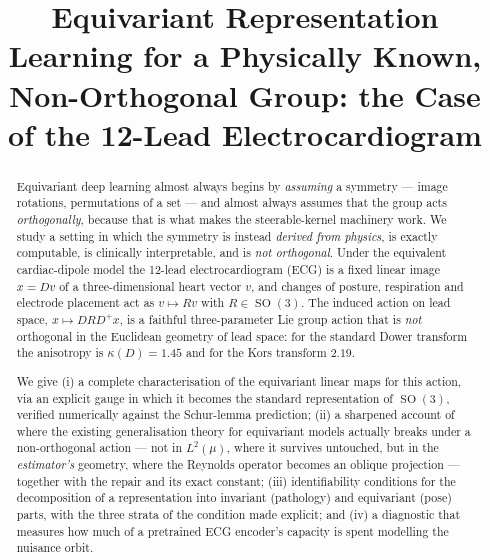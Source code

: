 \documentclass[11pt]{article}
\title{\bfseries Equivariant Representation Learning for a Physically Known,\\
Non-Orthogonal Group: the Case of the 12-Lead Electrocardiogram}
\author{}
\date{}
\theoremstyle{definition}
\DeclareMathOperator{\SO}{SO}
\begin{document}
\maketitle

\begin{abstract}
Equivariant deep learning almost always begins by \emph{assuming} a symmetry --- image
rotations, permutations of a set --- and almost always assumes that the group acts
\emph{orthogonally}, because that is what makes the steerable-kernel machinery work.
We study a setting in which the symmetry is instead \emph{derived from physics}, is
exactly computable, is clinically interpretable, and is \emph{not orthogonal}. Under
the equivalent cardiac-dipole model the 12-lead electrocardiogram (ECG) is a fixed
linear image $x = Dv$ of a three-dimensional heart vector $v$, and changes of posture,
respiration and electrode placement act as $v \mapsto Rv$ with $R \in \SO(3)$. The
induced action on lead space, $x \mapsto DRD^{+}x$, is a faithful three-parameter Lie
group action that is \emph{not} orthogonal in the Euclidean geometry of lead space:
for the standard Dower transform the anisotropy is $\kappa(D) = 1.45$ and for the Kors
transform $2.19$.

We give (i) a complete characterisation of the equivariant linear maps for this
action, via an explicit gauge in which it becomes the standard representation of
$\SO(3)$, verified numerically against the Schur-lemma prediction; (ii) a sharpened
account of where the existing generalisation theory for equivariant models actually
breaks under a non-orthogonal action --- not in $L^2(\mu)$, where it survives
untouched, but in the \emph{estimator's} geometry, where the Reynolds operator becomes
an oblique projection --- together with the repair and its exact constant; (iii)
identifiability conditions for the decomposition of a representation into invariant
(pathology) and equivariant (pose) parts, with the three strata of the condition made
explicit; and (iv) a diagnostic that measures how much of a pretrained ECG encoder's
capacity is spent modelling the nuisance orbit.


\end{abstract}
\end{document}

